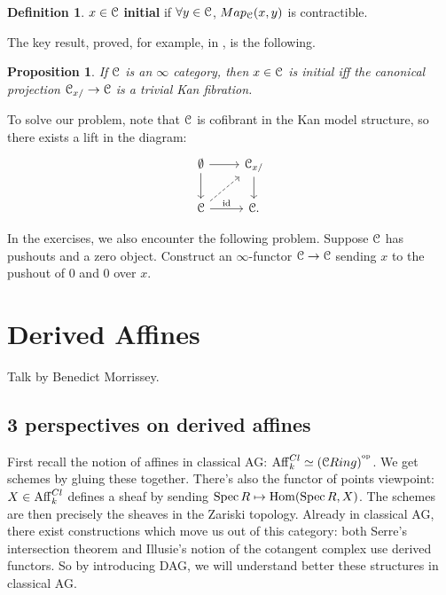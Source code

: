 \documentclass[10pt,a4paper,reqno,oneside]{book} %
\theoremstyle{plain}
\newtheorem{prop}[thm]{Proposition}
\theoremstyle{definition}
\newtheorem{defin}[thm]{Definition}
\theoremstyle{remark}
\numberwithin{equation}{section}
\begin{document}
\begin{defin}
$x \in \mathcal C$ \textbf{initial} if $\forall y \in \mathcal C$, $Map_{\mathcal C}(x,y)$ is contractible.
\end{defin}

The key result, proved, for example, in \cite{groth}, is the following.
\begin{prop}
If $\mathcal C$ is an $\infty$ category, then $x \in \mathcal C$ is initial iff the canonical projection $\mathcal C_{x/} \to \mathcal C$ is
a trivial Kan fibration.
\end{prop}

To solve our problem, note that $\mathcal C$ is cofibrant in the Kan model structure, so there exists a lift in the diagram:
\[
\begin{tikzcd}
\emptyset\arrow{d}\arrow{r} & \cC_{x/}\arrow{d} \\
\cC \arrow{r}{\id}\arrow[dashed]{ur} & \cC .
\end{tikzcd}
\]

In the exercises, we also encounter the following problem. Suppose $\mathcal C$ has pushouts and a zero object. Construct 
an $\infty$-functor $\mathcal C \to \mathcal C$ sending $x$ to the pushout of 0 and 0 over $x$. 






\chapter{Derived Affines}
Talk by Benedict Morrissey.

\section{3 perspectives on derived affines}

First recall the notion of affines in classical AG: $\mathrm{Aff}_k^{Cl} \simeq (\mathcal C Ring)^{^\mathrm{op}}$. We get schemes by gluing these together.
There's also the functor of points viewpoint: $X \in \mathrm{Aff}_k^{Cl}$ defines a sheaf by sending $\operatorname{Spec} R \mapsto \operatorname{Hom}
(\operatorname{Spec} R, X)$. The schemes are then precisely the sheaves in the Zariski topology.  Already in classical AG, there exist 
constructions which move us out of this category: 
both Serre's intersection theorem and Illusie's notion of the cotangent complex use derived functors.
So by introducing DAG, we will understand better these structures in classical AG.
\end{document}
